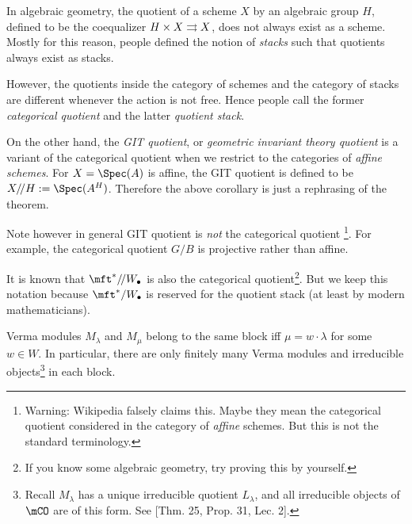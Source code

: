 \begin{rem}
	In algebraic geometry, the quotient of a scheme $X$ by an algebraic group $H$, defined to be the coequalizer $H\mt X \rightrightarrows X$, does not always exist as a scheme. Mostly for this reason, people defined the notion of \emph{stacks} such that quotients always exist as stacks.

	However, the quotients inside the category of schemes and the category of stacks are different whenever the action is not free. Hence people call the former \emph{categorical quotient} and the latter \emph{quotient stack}. 

	On the other hand, the \emph{GIT quotient}, or \emph{geometric invariant theory quotient} is a variant of the categorical quotient when we restrict to the categories of \emph{affine schemes}. For $X=\Spec(A)$ is affine, the GIT quotient is defined to be $X/\!/H:=\Spec(A^H)$. Therefore the above corollary is just a rephrasing of the theorem.

	Note however in general GIT quotient is \emph{not} the categorical quotient \footnote{Warning: Wikipedia falsely claims this. Maybe they mean the categorical quotient considered in the category of \emph{affine} schemes. But this is not the standard terminology.}. For example, the categorical quotient $G/B$ is projective rather than affine.

	It is known that $\mft^*/\!/W_\bullet$ is also the categorical quotient\footnote{If you know some algebraic geometry, try proving this by yourself.}. But we keep this notation because $\mft^*/W_\bullet$ is reserved for the quotient stack (at least by modern mathematicians).
\end{rem}

\begin{prop}
	Verma modules $M_\lambda$ and $M_\mu$ belong to the same block iff $\mu = w\cdot \lambda$ for some $w\in W$. In particular, there are only finitely many Verma modules and irreducible objects\footnote{Recall $M_\lambda$ has a unique irreducible quotient $L_\lambda$, and all irreducible objects of $\mCO$ are of this form. See [Thm. 25, Prop. 31, Lec. 2].} in each block.
\end{prop}

